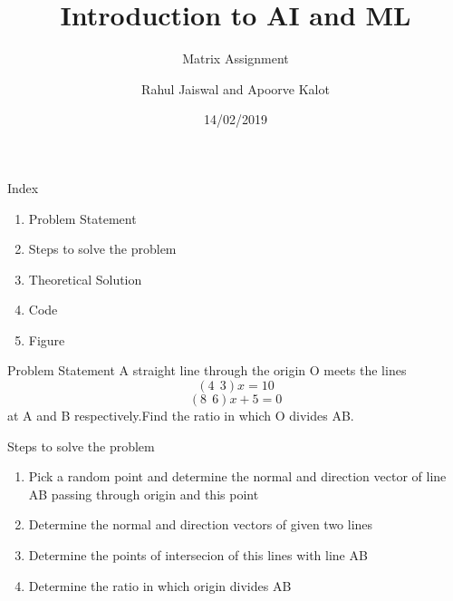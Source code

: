 \documentclass[11pt]{beamer}
\author{Rahul Jaiswal and Apoorve Kalot}
\title{Introduction to AI and ML}
\subtitle{Matrix Assignment}
\date{14/02/2019}
\begin{document}
\begin{frame}
\titlepage
\end{frame}

\begin{frame}{Index}
\begin{enumerate}
\item Problem Statement
\item Steps to solve the problem
\item Theoretical Solution
\item Code
\item Figure
\end{enumerate}
\end{frame}

\begin{frame}{Problem Statement}
A straight line through the origin O meets the lines
\begin{equation}
(4 \ \ 3)x=10
\end{equation}
\begin{equation}
(8 \ \ 6)x+5=0
\end{equation}
at A and B respectively.Find the ratio in which O divides AB.
\end{frame}

\begin{frame}{Steps to solve the problem}
\begin{enumerate}
\item Pick a random point and determine the normal and direction vector of line AB passing through origin and this point
\item Determine the normal and direction vectors of given two lines
\item Determine the points of intersecion of this lines with line AB
\item Determine the ratio in which origin divides AB
\end{enumerate}
\end{frame}
\end{document}
